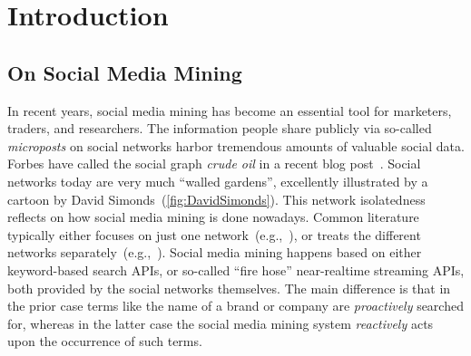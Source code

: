 \documentclass{iosart2c}
\begin{document}

\section{Introduction} \label{sec:introduction}
\subsection{On Social Media Mining}
In recent years, social media mining has become an essential tool for marketers, traders, and researchers.
The information people share publicly via so-called \emph{microposts} on social networks harbor tremendous amounts of valuable social data.
Forbes have called the social graph \emph{crude oil} in a recent blog post~\cite{ForbesPost}.
Social networks today are very much ``walled gardens'', excellently illustrated by a cartoon by David Simonds~(\autoref{fig:DavidSimonds}).
This network isolatedness reflects on how social media mining is done nowadays.
Common literature typically either focuses on just one network~(e.g.,~\cite{russell201121}), or treats the different networks separately~(e.g.,~\cite{russell2011mining}).
Social media mining happens based on either keyword-based search APIs, or so-called ``fire hose'' near-realtime streaming APIs, both provided by the social networks themselves.
The main difference is that in the prior case terms like the name of a brand or company are \emph{proactively} searched for, whereas in the latter case the social media mining system \emph{reactively} acts upon the occurrence of such terms.
\end{document}
